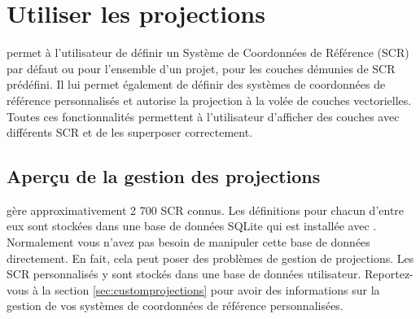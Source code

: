 \chapter{Utiliser les projections}\label{label_projections}


\qg permet à l'utilisateur de définir un Système de Coordonnées de Référence 
(SCR) par défaut ou pour l'ensemble d'un projet, pour les couches démunies de 
SCR prédéfini. Il lui permet également de définir des systèmes de coordonnées 
de référence personnalisés et autorise la projection à la volée de couches 
vectorielles. Toutes ces fonctionnalités permettent à l'utilisateur d'afficher 
des couches avec différents SCR et de les superposer correctement.

\section{Aperçu de la gestion des projections}\label{label_projoverview}

\qg gère approximativement 2 700 SCR connus. Les définitions pour
chacun d'entre eux sont stockées dans une base de données SQLite qui est
installée avec \qg. Normalement vous n'avez pas besoin de manipuler cette 
base de données directement. En fait, cela peut poser des problèmes de
gestion de projections. Les SCR personnalisés y sont stockés dans une
base de données utilisateur. Reportez-vous à la section \ref{sec:customprojections} 
pour avoir des informations sur la gestion de vos systèmes de coordonnées de
référence personnalisées.

